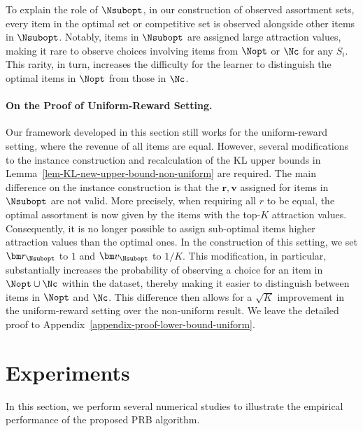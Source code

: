 \documentclass[10pt, letterpaper]{article}
\begin{document}
To explain the role of $\Nsubopt$, in our construction of observed assortment sets, every item in the optimal set or competitive set is observed alongside other items in $\Nsubopt$. Notably, items in $\Nsubopt$ are assigned large attraction values, making it rare to observe choices involving items from $\Nopt$ or $\Nc$ for any $S_i$. This rarity, in turn, increases the difficulty for the learner to distinguish the optimal items in $\Nopt$ from those in $\Nc$.



\paragraph{On the Proof of Uniform-Reward Setting.} Our framework developed in this section still works for the uniform-reward setting, where the revenue of all items are equal. However, several modifications to the instance construction and recalculation of the KL upper bounds in Lemma~\ref{lem-KL-new-upper-bound-non-uniform} are required. The main difference on the instance construction is that the $\bm r, \bm v$ assigned for items in $\Nsubopt$ are not valid. More precisely, when requiring all $r$ to be equal, the optimal assortment is now given by the items with the top-$K$ attraction values. Consequently, it is no longer possible to assign sub-optimal items higher attraction values than the optimal ones. In the construction of this setting, we set $\bm r_{\Nsubopt}$ to $1$ and $\bm v_{\Nsubopt}$ to $1/K$. This modification, in particular, substantially increases the probability of observing a choice for an item in $\Nopt \cup \Nc$ within the dataset, thereby making it easier to distinguish between items in $\Nopt$ and $\Nc$. This difference then allows for a $\sqrt{K}$ improvement in the uniform-reward setting over the non-uniform result. We leave the detailed proof to Appendix~\ref{appendix-proof-lower-bound-uniform}.

\section{Experiments}

In this section, we perform several numerical studies to illustrate the empirical performance of the proposed PRB algorithm. 
\end{document}
